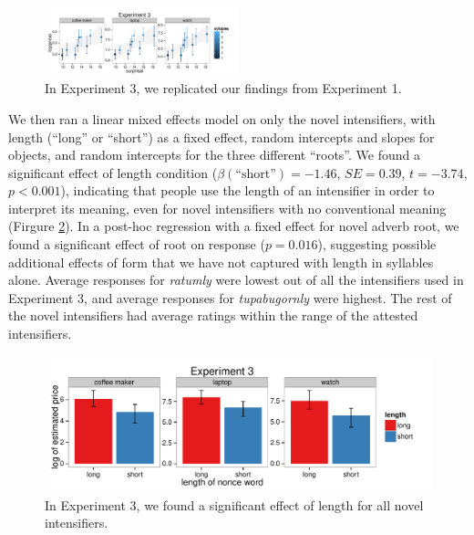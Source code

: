 \documentclass[10pt,letterpaper]{article}
\newcommand{\w}[1]{\emph{#1}}
\begin{document}
\begin{figure}[hbt]
\begin{center}
\includegraphics[width=0.5\textwidth]{../analysis/output/Experiment3/scatter.pdf}
\end{center}
\caption{In Experiment 3, we replicated our findings from Experiment 1.} 
\label{exp3_replication}
\end{figure}

We then ran a linear mixed effects model on only the novel intensifiers, with length (``long'' or ``short'') as a fixed effect, random intercepts and slopes for objects, and random intercepts for the three different ``roots''. We found a significant effect of length condition ($\beta(\mbox{``short''})=-1.46$, $SE=0.39$, $t=-3.74$, $p<0.001$), indicating that people use the length of an intensifier in order to interpret its meaning, even for novel intensifiers with no conventional meaning (Firgure \ref{exp3_novel}).
In a post-hoc regression with a fixed effect for novel adverb root, we found a significant effect of root on response ($p=0.016$), suggesting possible additional effects of form that we have not captured with length in syllables alone. Average responses for \w{ratumly} were lowest out of all the intensifiers used in Experiment 3, and average responses for \w{tupabugornly} were highest. The rest of the novel intensifiers had average ratings within the range of the attested intensifiers.

\begin{figure}[hbt]
\begin{center}
\includegraphics[width=.8\textwidth]{../analysis/output/Experiment3/novel.pdf}
\end{center}
\caption{In Experiment 3, we found a significant effect of length for all novel intensifiers.} 
\label{exp3_novel}
\end{figure}
\end{document}
